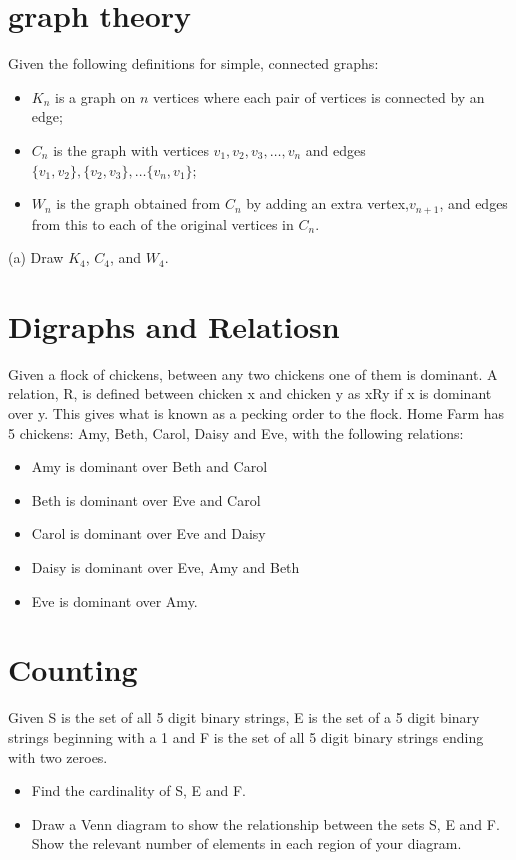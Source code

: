 \documentclass[12pt]{article} %
\begin{document}

\section{graph theory }
Given the following definitions for simple, connected graphs:
\begin{itemize}
\item $K_n$ is a graph on $n$ vertices where each pair of vertices is connected by an edge;
\item $C_n$ is the graph with vertices $v_1, v_2, v_3, \dots, v_n$ and edges $\{v_1,v_2\}, \{v_2,v_3\}, \dots\{v_n, v_1\}$;
\item $W_n$ is the graph obtained from $C_n$ by adding an extra vertex,$v_{n+1}$, and edges
from this to each of the original vertices in $C_n$.
\end{itemize}
(a) Draw $K_4$, $C_4$, and $W_4$. 
\newpage
\section{Digraphs and Relatiosn}
Given a flock of chickens, between any two chickens one of them is
dominant. A relation, R, is defined between chicken x and chicken y as xRy if x is
dominant over y. This gives what is known as a pecking order to the flock. Home
Farm has 5 chickens: Amy, Beth, Carol, Daisy and Eve, with the following relations:

\begin{itemize}
\item Amy is dominant over Beth and Carol
\item Beth is dominant over Eve and Carol
\item Carol is dominant over Eve and Daisy
\item Daisy is dominant over Eve, Amy and Beth
\item Eve is dominant over Amy.
\end{itemize}

\newpage
\section{Counting}
Given S is the set of all 5 digit binary strings, E is the set of a 5 digit
binary strings beginning with a 1 and F is the set of all 5 digit binary strings ending
with two zeroes.
\begin{itemize}
\item[(a)] Find the cardinality of S, E and F.
\item[(b)] Draw a Venn diagram to show the relationship between the sets S, E and F.
Show the relevant number of elements in each region of your diagram.
\end{itemize}
\newpage
\end{document}
